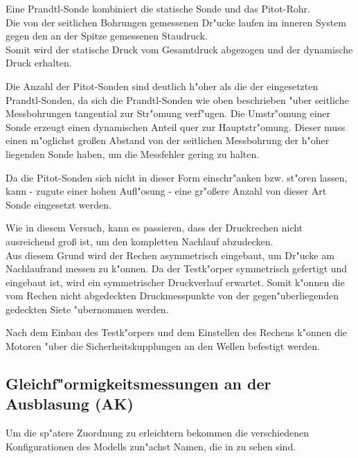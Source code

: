 Eine Prandtl-Sonde kombiniert die statische Sonde und das Pitot-Rohr.\\
Die von der seitlichen Bohrungen gemessenen Dr"ucke laufen im inneren System gegen den an der Spitze gemessenen Staudruck.\\
Somit wird der statische Druck vom Gesamtdruck abgezogen und der dynamische Druck erhalten.

Die Anzahl der Pitot-Sonden sind deutlich h"oher als die der eingesetzten Prandtl-Sonden, da sich die Prandtl-Sonden wie oben beschrieben "uber seitliche Messbohrungen tangential zur Str"omung verf"ugen. Die Umstr"omung einer Sonde erzeugt einen dynamischen Anteil quer zur Hauptstr"omung. Dieser muss einen m"oglichst gro\ss{}en Abstand von der seitlichen Messbohrung der h"oher liegenden Sonde haben, um die Messfehler gering zu halten.

Da die Pitot-Sonden sich nicht in dieser Form einschr"anken bzw. st"oren lassen, kann - zugute einer hohen Aufl"osung - eine gr"o\ss{}ere Anzahl von dieser Art Sonde eingesetzt werden.

Wie in diesem Versuch, kann es passieren, dass der Druckrechen nicht ausreichend gro\ss{} ist, um den kompletten Nachlauf abzudecken.\\
Aus diesem Grund wird der Rechen asymmetrisch eingebaut, um Dr"ucke am Nachlaufrand messen zu k"onnen. Da der Testk"orper symmetrisch gefertigt und eingebaut ist, wird ein symmetrischer Druckverlauf erwartet. Somit k"onnen die vom Rechen nicht abgedeckten Druckmesspunkte von der gegen"uberliegenden gedeckten Siete "ubernommen werden.

Nach dem Einbau des Testk"orpers und dem Einstellen des Rechens k"onnen die Motoren "uber die Sicherheitskupplungen an den Wellen befestigt werden.


\subsection{Gleichf"ormigkeitsmessungen an der Ausblasung (AK)}
\label{s:Gleichf"ormigkeitsmessungen}
Um die sp"atere Zuordnung zu erleichtern bekommen die verschiedenen Konfigurationen des Modells zun"achst Namen, die in  zu sehen sind.

